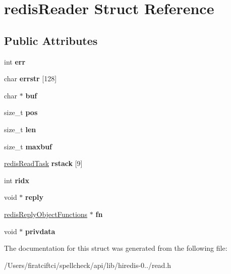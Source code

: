 \hypertarget{structredis_reader}{}\section{redis\+Reader Struct Reference}
\label{structredis_reader}
\subsection*{Public Attributes}
\begin{DoxyCompactItemize}
\item 
\mbox{\label{structredis_reader_ad579da9500bb3f8c97b79ed4f8c24805}} 
int {\bfseries err}
\item 
\mbox{\label{structredis_reader_a7af28e9c4e7a4c1ccd8cf8eefb277615}} 
char {\bfseries errstr} \mbox{[}128\mbox{]}
\item 
\mbox{\label{structredis_reader_a2f15e6a06fde31acc1765e22776e5a24}} 
char $\ast$ {\bfseries buf}
\item 
\mbox{\label{structredis_reader_af57fca3220a12be68ddb2e8001d21485}} 
size\+\_\+t {\bfseries pos}
\item 
\mbox{\label{structredis_reader_ac16e7c62f35a4f303d61647e6afa9512}} 
size\+\_\+t {\bfseries len}
\item 
\mbox{\label{structredis_reader_ae90fdd33997ad3933dc81fea34e7a012}} 
size\+\_\+t {\bfseries maxbuf}
\item 
\mbox{\label{structredis_reader_a080b2b270dcc6362f8c8f974d42be9f7}} 
\mbox{\hyperlink{structredis_read_task}{redis\+Read\+Task}} {\bfseries rstack} \mbox{[}9\mbox{]}
\item 
\mbox{\label{structredis_reader_a5d8453b01f50ecad257d26b2b322b9a0}} 
int {\bfseries ridx}
\item 
\mbox{\label{structredis_reader_aa2684486789472eee6e88723b06a4335}} 
void $\ast$ {\bfseries reply}
\item 
\mbox{\label{structredis_reader_aef207ed70dcbd6c9ac9071d40c8becb2}} 
\mbox{\hyperlink{structredis_reply_object_functions}{redis\+Reply\+Object\+Functions}} $\ast$ {\bfseries fn}
\item 
\mbox{\label{structredis_reader_a26d3b75a46555f9836849e160bc0b6de}} 
void $\ast$ {\bfseries privdata}
\end{DoxyCompactItemize}


The documentation for this struct was generated from the following file\+:\begin{DoxyCompactItemize}
\item 
/\+Users/firatciftci/spellcheck/api/lib/hiredis-\/0../read.\+h\end{DoxyCompactItemize}
